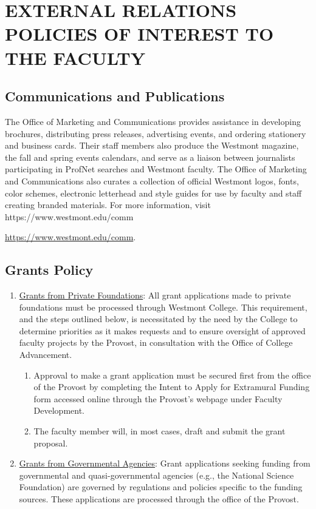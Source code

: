 \section{EXTERNAL RELATIONS POLICIES OF INTEREST TO THE FACULTY}
	\subsection{Communications and Publications}

		The Office of Marketing and Communications provides assistance in
		developing brochures, distributing press releases, advertising events,
		and ordering stationery and business cards. Their staff members also
		produce the Westmont magazine, the fall and spring events calendars, and
		serve as a liaison between journalists participating in ProfNet searches
		and Westmont faculty.  The Office of Marketing and Communications also
		curates a collection of official Westmont logos, fonts, color schemes,
		electronic letterhead and style guides for use by faculty and staff
		creating branded materials.  For more information, visit
		https://www.westmont.edu/comm

		\underline{https://www.westmont.edu/comm}.
	\subsection{Grants Policy}
		\begin{enumerate}[label=\alph*)]
			\item{\underline{Grants from Private
					Foundations}:  All grant applications made to private foundations must be processed through Westmont College.  This requirement, and the steps outlined below, is necessitated by the need by the College to determine priorities as it makes requests and to ensure oversight of approved faculty projects by the Provost, in consultation with the Office of College Advancement.
				\begin{enumerate}[label=\alph*)]
					\item{Approval to make a grant application
						must be secured first from
						the office of the Provost by
						completing the Intent to
						Apply for Extramural Funding
						form accessed online through
						the Provost's webpage under
						Faculty Development.}
					\item{The faculty member will, in most
						cases, draft and submit the
						grant proposal.}
				\end{enumerate}
			}
			\item{\underline{Grants from Governmental Agencies}:  Grant applications seeking funding from governmental and quasi-governmental agencies (e.g., the National Science Foundation) are governed by regulations and policies specific to the funding sources. These applications are processed through the office of the Provost.
			}
		\end{enumerate}
